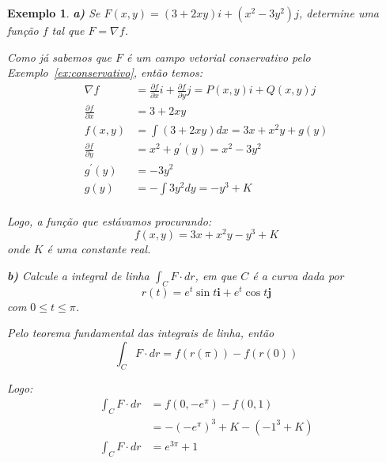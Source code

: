 \documentclass{article}
\newcommand{\PartialDer}[2] {\frac{\partial #1}{\partial #2}}
\newtheorem{example}{Exemplo}[section]
\begin{document}
        \begin{example}
            \textbf{a)} Se $F(x,y) = (3 + 2xy) i + (x^2 - 3y^2) j$, determine uma função $f$ tal que
            $F = \nabla f$.
        
            Como já sabemos que $F$ é um campo vetorial conservativo pelo Exemplo~\ref{ex:conservativo}, então
            temos:
            \begin{align*}
                \nabla f &= \PartialDer{f}{x}i + \PartialDer{f}{y}j = P(x,y) i + Q(x,y) j\\
                \PartialDer{f}{x} &= 3 + 2xy\\
                f(x,y) &= \int (3 + 2xy) dx = 3x + x^2y + g(y)\\
                \PartialDer{f}{y} &= x^2 + g^\prime (y) = x^2 - 3y^2\\
                g^\prime (y) &= -3y^2\\
                g(y) &= - \int 3y^2 dy = -y^3 + K\\
            \end{align*}

            Logo, a função que estávamos procurando:
            \[
                f(x,y) = 3x + x^2y -y^3 + K
            \]
            onde $K$ é uma constante real.

            \textbf{b)} Calcule a integral de linha $\int_C F \cdot dr$, em que $C$ é a curva dada por
            \[
                r(t) = e^t \sin t \textbf{i} + e^t \cos t \textbf{j}
            \]
            com $0 \leq t \leq \pi$.

            Pelo teorema fundamental das integrais de linha, então
            \[
                \int_C F \cdot dr = f(r(\pi)) - f(r(0))
            \]

            Logo:
            \begin{align*}
                \int_C F \cdot dr &= f(0, -e^\pi) - f(0, 1)\\
                &= -\left(-e^\pi\right)^3 + K - (-1^3 + K)\\
                \int_C F \cdot dr &= e^{3\pi} + 1
            \end{align*}
        \end{example}
\end{document}
